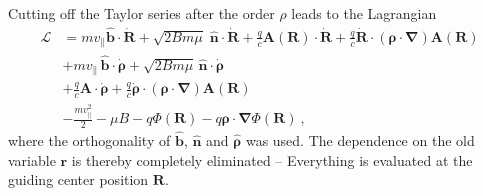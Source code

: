 \documentclass{scrartcl}
\renewcommand{\vec}[1]{\boldsymbol{#1}}
\newcommand{\uv}[1]{\hat{\vec{#1}}}
\newcommand{\bnabla}{\vec{\nabla}}
\newcommand{\rv}{\vec{r}}
\newcommand{\rvgc}{\vec{R}} %
\newcommand{\PSL}{\mathcal{L}}
\newcommand{\subparallel}{{\scriptscriptstyle\parallel}}
\begin{document}
Cutting off the Taylor series after the order $\rho$ leads to the Lagrangian
\begin{align*}
\PSL &= mv_\subparallel \uv{b}\cdot\dot{\rvgc} + \sqrt{2Bm\mu}\;\uv{n}\cdot\dot{\rvgc} + \frac{q}{c}\vec{A}(\rvgc)\cdot\dot{\rvgc} + \frac{q}{c}\dot{\rvgc}\cdot(\vec{\rho}\cdot\bnabla)\vec{A}(\rvgc)\\
& + mv_\subparallel\,\uv{b}\cdot\dot{\vec{\rho}} + \sqrt{2Bm\mu}\,\uv{n}\cdot\dot{\vec{\rho}} \\
& + \frac{q}{c}\vec{A}\cdot\dot{\vec{\rho}} + \frac{q}{c}\dot{\vec{\rho}}\cdot(\vec{\rho}\cdot\bnabla)\vec{A}(\rvgc) \\
& - \frac{m v_\subparallel^2}{2} - \mu B - q\Phi(\rvgc) - q\vec{\rho}\cdot\bnabla\Phi(\rvgc) \ ,
\end{align*}
where the orthogonality of $\uv{b}$, $\uv{n}$ and $\uv{\rho}$ was used. The dependence on the old variable $\rv$ is thereby completely eliminated -- Everything is evaluated at the guiding center position $\rvgc$.
\end{document}
